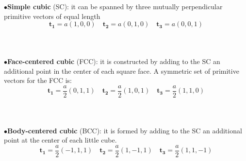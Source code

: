 \documentclass[10.75pt,a4paper,openright,bottom=2cm]{article}
\renewcommand{\Vec}[1]{\boldsymbol{#1}}
\begin{document}
    $\bullet$\;\textbf{Simple cubic} (SC): it can be spanned by three mutually perpendicular primitive vectors of equal length
    \[
    \Vec{t_1}=a(1,0,0) \quad \Vec{t_2}=a(0,1,0) \quad \Vec{
    t_3}=a(0,0,1)
    \]\\\\\\
    $\bullet$\;\textbf{Face-centered cubic} (FCC): it is constructed by adding to the SC an additional point in the center of each square face. A symmetric set of primitive vectors for the FCC is:
    \[
    \Vec{t_1}=\frac{a}{2}(0,1,1) \quad \Vec{t_2}=\frac{a}{2}(1,0,1) \quad \Vec{t_3}=\frac{a}{2}(1,1,0)
    \]\\\\\\
    $\bullet$\;\textbf{Body-centered cubic} (BCC): it is formed by adding to the SC an additional point at the center of each little cube.
    \[
    \Vec{t_1}=\frac{a}{2}(-1,1,1) \quad \Vec{t_2}=\frac{a}{2}(1,-1,1) \quad \Vec{t_3}=\frac{a}{2}(1,1,-1)
    \]
\newline
\end{document}
